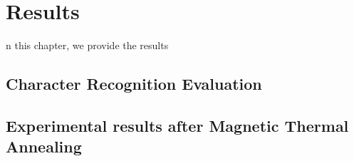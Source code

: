 \chapter{Results}
\label{ch:results}


n this chapter, we provide the results 
\section{Character Recognition Evaluation}
\section{Experimental results after Magnetic Thermal Annealing}